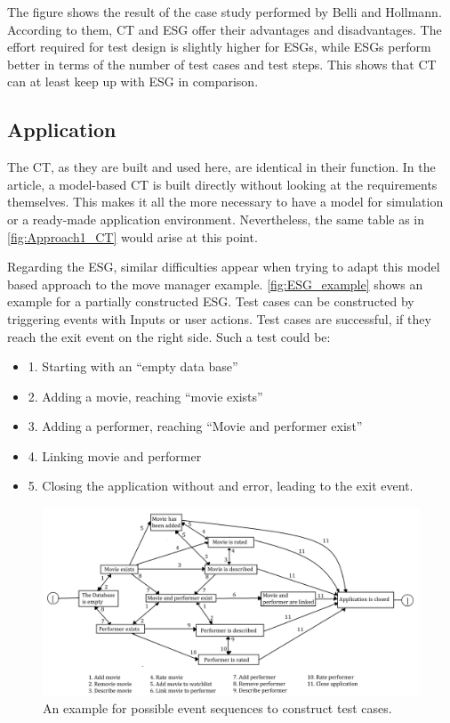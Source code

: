 The figure shows the result of the case study performed by Belli and Hollmann\cite{Belli2009}. According to them, CT and ESG offer their advantages and disadvantages. The effort required for test design is slightly higher for ESGs, while ESGs perform better in terms of the number of test cases and test steps. This shows that CT can at least keep up with ESG in comparison.

\subsection{Application}

The CT, as they are built and used here, are identical in their function. In the article, a model-based CT is built directly without looking at the requirements themselves. This makes it all the more necessary to have a model for simulation or a ready-made application environment. Nevertheless, the same table as in \autoref{fig:Approach1_CT} would arise at this point.

Regarding the ESG, similar difficulties appear when trying to adapt this model based approach to the move manager example. \autoref{fig:ESG_example} shows an example for a partially constructed ESG. Test cases can be constructed by triggering events with Inputs or user actions. Test cases are successful, if they reach the exit event on the right side. Such a test could be: 

\begin{itemize}
	\item 1. Starting with an \enquote{empty data base}
	\item 2. Adding a movie, reaching \enquote{movie exists}
	\item 3. Adding a performer, reaching \enquote{Movie and performer exist}
	\item 4. Linking movie and performer
	\item 5. Closing the application without and error, leading to the exit event.
\end{itemize}

\begin{figure}[H]
\centering
\includegraphics[scale=0.175]{../images/ESGamBeispiel2.png} 
\caption{An example for possible event sequences to construct test cases.}
\label{fig:ESG_example}
\end{figure}

